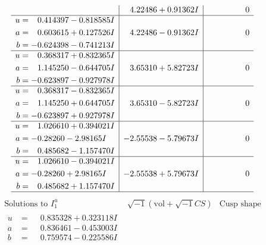 \documentclass[1p]{elsarticle_modified}
\theoremstyle{definition}
\newcommand{\I}{\sqrt{-1}}
\begin{document}
$$\begin{array}{c|c|c}
 & \phantom{-}4.22486 + 0.91362 I & \phantom{-0.000000 } 0 \\ \hline\begin{aligned}
u &= \phantom{-}0.414397 - 0.818585 I \\
a &= \phantom{-}0.603615 + 0.127526 I \\
b &= -0.624398 - 0.741213 I\end{aligned}
 & \phantom{-}4.22486 - 0.91362 I & \phantom{-0.000000 } 0 \\ \hline\begin{aligned}
u &= \phantom{-}0.368317 + 0.832365 I \\
a &= \phantom{-}1.145250 - 0.644705 I \\
b &= -0.623897 - 0.927978 I\end{aligned}
 & \phantom{-}3.65310 + 5.82723 I & \phantom{-0.000000 } 0 \\ \hline\begin{aligned}
u &= \phantom{-}0.368317 - 0.832365 I \\
a &= \phantom{-}1.145250 + 0.644705 I \\
b &= -0.623897 + 0.927978 I\end{aligned}
 & \phantom{-}3.65310 - 5.82723 I & \phantom{-0.000000 } 0 \\ \hline\begin{aligned}
u &= \phantom{-}1.026610 + 0.394021 I \\
a &= -0.28260 - 2.98165 I \\
b &= \phantom{-}0.485682 - 1.157470 I\end{aligned}
 & -2.55538 - 5.79673 I & \phantom{-0.000000 } 0 \\ \hline\begin{aligned}
u &= \phantom{-}1.026610 - 0.394021 I \\
a &= -0.28260 + 2.98165 I \\
b &= \phantom{-}0.485682 + 1.157470 I\end{aligned}
 & -2.55538 + 5.79673 I & \phantom{-0.000000 } 0\\
 \hline 
 \end{array}$$\newpage$$\begin{array}{c|c|c}  
\text{Solutions to }I^u_{1}& \I (\text{vol} + \sqrt{-1}CS) & \text{Cusp shape}\\
 \hline 
\begin{aligned}
u &= \phantom{-}0.835328 + 0.323118 I \\
a &= \phantom{-}0.836461 - 0.453003 I \\
b &= \phantom{-}0.759574 - 0.225586 I\end{aligned}

\end{array}$$
\end{document}
